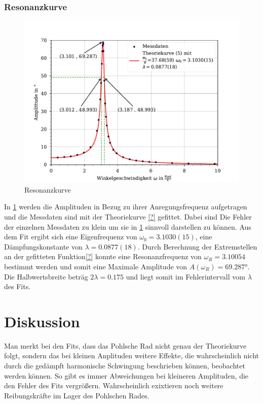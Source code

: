 \documentclass[11pt, a4paper]{article}
\begin{document}
	\subsubsection{Resonanzkurve}
	\begin{figure}
        \centering
        \includegraphics[width=\textwidth]{./10Plot.pdf}

        \caption{Resonanzkurve}
        \label{fig:Resonanzkurve}
    \end{figure}
    In \ref{fig:Resonanzkurve} werden die Amplituden in Bezug zu ihrer Anregungsfrequenz aufgetragen und die Messdaten sind
    mit der Theoriekurve \ref{?} gefittet. Dabei sind Die Fehler der einzelnen Messdaten zu klein um sie in \ref{fig:Resonanzkurve} sinnvoll darstellen zu können. Aus dem Fit ergibt sich eine Eigenfrequenz von $\omega_0=3.1030(15)$, eine Dämpfungskonstante von $\lambda=0.0877(18)$. Durch Berechnung der Extremstellen an der gefitteten Funktion\ref{?} konnte eine Resonanzfrequenz von $\omega_R=3.10054$ bestimmt werden und somit eine Maximale Amplitude von $A(\omega_R)=69.287°$. Die Halbwertsbreite beträg $2\lambda=0.175$ und liegt somit im Fehlerintervall vom $\lambda$ des Fits.
	
    \section{Diskussion}

    Man merkt bei den Fits, dass das Pohlsche Rad nicht genau der Theoriekurve folgt, sondern das bei kleinen Anplituden
    weitere Effekte, die wahrscheinlich nicht durch die gedämpft harmonische Schwingung beschrieben können, beobachtet werden können.
    So gibt es immer Abweichungen bei kleineren Amplituden, die den Fehler des Fits vergrößern. Wahrscheinlich exixtieren noch weitere
    Reibungskräfte im Lager des Pohlschen Rades. \\
\end{document}
